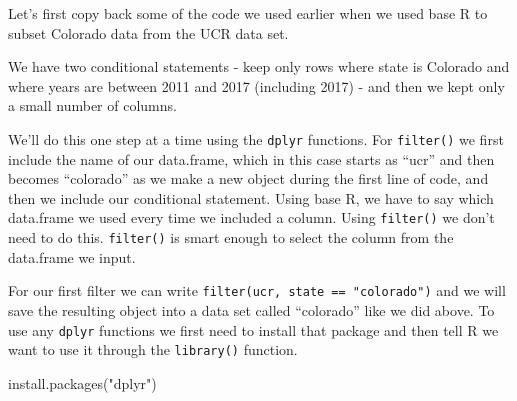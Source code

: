\documentclass[
]{krantz}
\makeatletter
\newenvironment{Shaded}{\begin{snugshade}}{\end{snugshade}}
\newcommand{\DecValTok}[1]{\textcolor[rgb]{0.06,0.06,0.06}{#1}}
\newcommand{\FunctionTok}[1]{\textcolor[rgb]{0,0,0}{#1}}
\newcommand{\NormalTok}[1]{#1}
\newcommand{\OtherTok}[1]{\textcolor[rgb]{0.37,0.37,0.37}{#1}}
\newcommand{\SpecialCharTok}[1]{\textcolor[rgb]{0,0,0}{#1}}
\newcommand{\StringTok}[1]{\textcolor[rgb]{0.5,0.5,0.5}{#1}}
\newenvironment{kframe}{%
\medskip{}
\setlength{\fboxsep}{.8em}
 \def\at@end@of@kframe{}%
 \ifinner\ifhmode%
  \def\at@end@of@kframe{\end{minipage}}%
  \begin{minipage}{\columnwidth}%
 \fi\fi%
 \def\FrameCommand##1{\hskip\@totalleftmargin \hskip-\fboxsep
 \colorbox{shadecolor}{##1}\hskip-\fboxsep
     \hskip-\linewidth \hskip-\@totalleftmargin \hskip\columnwidth}%
 \MakeFramed {\advance\hsize-\width
   \@totalleftmargin\z@ \linewidth\hsize
   \@setminipage}}%
 {\par\unskip\endMakeFramed%
 \at@end@of@kframe}
\renewenvironment{Shaded}{\begin{kframe}}{\end{kframe}}
\makeatother
\begin{document}
Let's first copy back some of the code we used earlier when we used base R to subset Colorado data from the UCR data set.

\begin{Shaded}
\end{Shaded}

We have two conditional statements - keep only rows where state is Colorado and where years are between 2011 and 2017 (including 2017) - and then we kept only a small number of columns.

We'll do this one step at a time using the \texttt{dplyr} functions. For \texttt{filter()} we first include the name of our data.frame, which in this case starts as ``ucr'' and then becomes ``colorado'' as we make a new object during the first line of code, and then we include our conditional statement. Using base R, we have to say which data.frame we used every time we included a column. Using \texttt{filter()} we don't need to do this. \texttt{filter()} is smart enough to select the column from the data.frame we input.

For our first filter we can write \texttt{filter(ucr,\ state\ ==\ "colorado")} and we will save the resulting object into a data set called ``colorado'' like we did above. To use any \texttt{dplyr} functions we first need to install that package and then tell R we want to use it through the \texttt{library()} function.

\begin{Shaded}
\begin{Highlighting}[]
\FunctionTok{install.packages}\NormalTok{(}\StringTok{"dplyr"}\NormalTok{)}
\end{Highlighting}
\end{Shaded}
\end{document}
